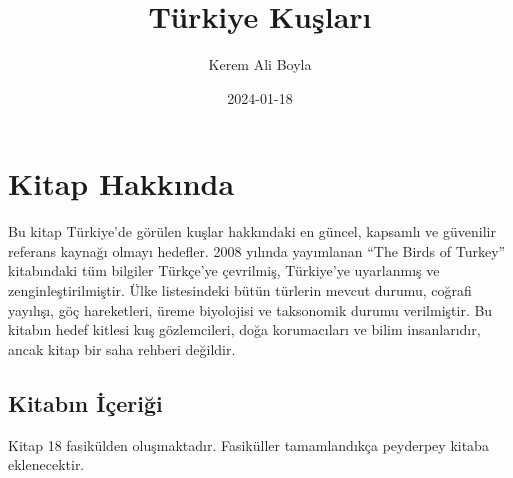 \documentclass[
  letterpaper,
  DIV=11,
  numbers=noendperiod]{scrreprt}
\title{Türkiye Kuşları}
\author{Kerem Ali Boyla}
\date{2024-01-18}
\renewcommand*\contentsname{Table of contents}
\newcommand\contentsname{Table of contents}
\begin{document}
\maketitle

\renewcommand*\contentsname{Table of contents}
{
\hypersetup{linkcolor=}
\setcounter{tocdepth}{2}
\tableofcontents
}

\chapter*{Kitap Hakkında}\label{kitap-hakkux131nda}


Bu kitap Türkiye'de görülen kuşlar hakkındaki en güncel, kapsamlı ve
güvenilir referans kaynağı olmayı hedefler. 2008 yılında yayımlanan
``The Birds of Turkey'' kitabındaki tüm bilgiler Türkçe'ye çevrilmiş,
Türkiye'ye uyarlanmış ve zenginleştirilmiştir. Ülke listesindeki bütün
türlerin mevcut durumu, coğrafi yayılışı, göç hareketleri, üreme
biyolojisi ve taksonomik durumu verilmiştir. Bu kitabın hedef kitlesi
kuş gözlemcileri, doğa korumacıları ve bilim insanlarıdır, ancak kitap
bir saha rehberi değildir.

\section*{Kitabın İçeriği}\label{kitabux131n-iuxe7eriux11fi}


Kitap 18 fasikülden oluşmaktadır. Fasiküller tamamlandıkça peyderpey
kitaba eklenecektir.
\end{document}
